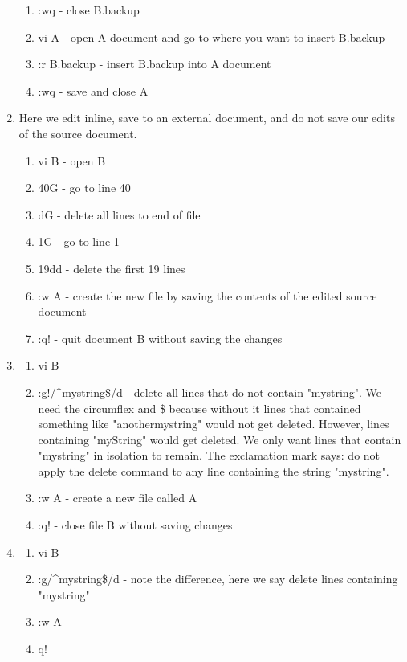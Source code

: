 \begin{enumerate}
\begin{enumerate}
		\item :wq - close B.backup
		\item vi A - open A document and go to where you want to insert B.backup
		\item :r B.backup - insert B.backup into A document
		\item :wq - save and close A
	\end{enumerate}
	\item {} Here we edit inline, save to an external document, and do not save our edits of the source document.
	\begin{enumerate}
		\item vi B - open B
		\item 40G - go to line 40
		\item dG - delete all lines to end of file
		\item 1G - go to line 1
		\item 19dd - delete the first 19 lines
		\item :w A - create the new file by saving the contents of the edited source document
		\item :q! - quit document B without saving the changes
	\end{enumerate}
	\item {}
	\begin{enumerate}
		\item vi B
		\item :g!/\textasciicircum{}mystring\$/d - delete all lines that do not contain "mystring". We need the circumflex and \$ because without it lines that contained something like "anothermystring" would not get deleted. However, lines containing "myString" would get deleted. We only want lines that contain "mystring" in isolation to remain. The exclamation mark says: do not apply the delete command to any line containing the string "mystring".
		\item :w A - create a new file called A
		\item :q! - close file B without saving changes
	\end{enumerate}
	\item {}
	\begin{enumerate} 
	\item vi B
	\item :g/\textasciicircum{}mystring\$/d - note the difference, here we say delete lines containing "mystring"
	\item :w A
	\item q!
	\end{enumerate}
\end{enumerate}
	 
